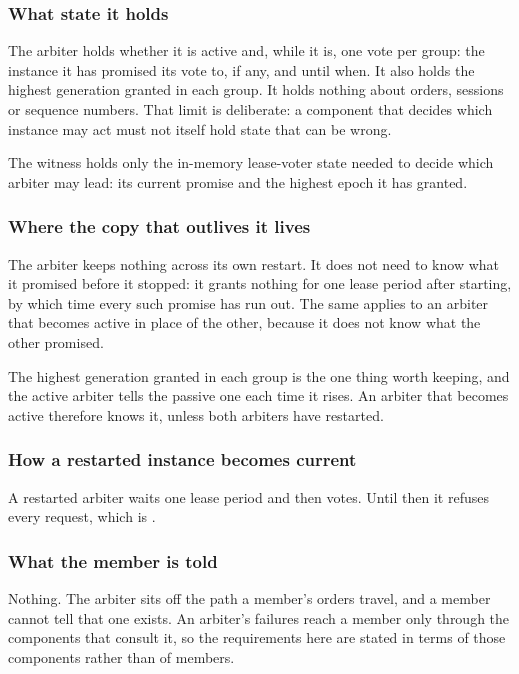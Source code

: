 \subsubsection{What state it holds}
\label{sec:ha:enabled:arbiter:state}

The arbiter holds whether it is active and, while it is, one vote per group: the
instance it has promised its vote to, if any, and until when. It also holds the
highest generation granted in each group. It holds nothing about orders, sessions
or sequence numbers. That limit is deliberate: a component that decides which
instance may act must not itself hold state that can be wrong.

The witness holds only the in-memory lease-voter state needed to decide which
arbiter may lead: its current promise and the highest epoch it has granted.

\subsubsection{Where the copy that outlives it lives}
\label{sec:ha:enabled:arbiter:durable}

The arbiter keeps nothing across its own restart. It does not need to know what it
promised before it stopped: it grants nothing for one lease period after starting,
by which time every such promise has run out. The same applies to an arbiter that
becomes active in place of the other, because it does not know what the other
promised.

The highest generation granted in each group is the one thing worth keeping, and
the active arbiter tells the passive one each time it rises. An arbiter that
becomes active therefore knows it, unless both arbiters have restarted.

\subsubsection{How a restarted instance becomes current}
\label{sec:ha:enabled:arbiter:recovery}

A restarted arbiter waits one lease period and then votes. Until then it refuses
every request, which is .

\subsubsection{What the member is told}
\label{sec:ha:enabled:arbiter:member}

Nothing. The arbiter sits off the path a member's orders travel, and a member
cannot tell that one exists. An arbiter's failures reach a member only through
the components that consult it, so the requirements here are stated in terms of
those components rather than of members.

